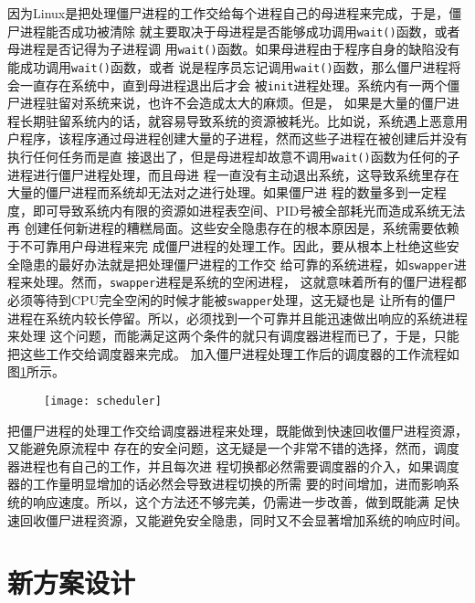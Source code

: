\documentclass{swfuthesism}
\begin{document}
因为Linux是把处理僵尸进程的工作交给每个进程自己的母进程来完成，于是，僵尸进程能否成功被清除
就主要取决于母进程是否能够成功调用\texttt{wait()}函数，或者母进程是否记得为子进程调
用\texttt{wait()}函数。如果母进程由于程序自身的缺陷没有能成功调用\texttt{wait()}函数，或者
说是程序员忘记调用\texttt{wait()}函数，那么僵尸进程将会一直存在系统中，直到母进程退出后才会
被\texttt{init}进程处理。系统内有一两个僵尸进程驻留对系统来说，也许不会造成太大的麻烦。但是，
如果是大量的僵尸进程长期驻留系统内的话，就容易导致系统的资源被耗光。比如说，系统遇上恶意用
户程序，该程序通过母进程创建大量的子进程，然而这些子进程在被创建后并没有执行任何任务而是直
接退出了，但是母进程却故意不调用\texttt{wait()}函数为任何的子进程进行僵尸进程处理，而且母进
程一直没有主动退出系统，这导致系统里存在大量的僵尸进程而系统却无法对之进行处理。如果僵尸进
程的数量多到一定程度，即可导致系统内有限的资源如进程表空间、PID号被全部耗光而造成系统无法再
创建任何新进程的糟糕局面。这些安全隐患存在的根本原因是，系统需要依赖于不可靠用户母进程来完
成僵尸进程的处理工作。因此，要从根本上杜绝这些安全隐患的最好办法就是把处理僵尸进程的工作交
给可靠的系统进程，如\texttt{swapper}进程来处理。然而，\texttt{swapper}进程是系统的空闲进程，
这就意味着所有的僵尸进程都必须等待到CPU完全空闲的时候才能被\texttt{swapper}处理，这无疑也是
让所有的僵尸进程在系统内较长停留。所以，必须找到一个可靠并且能迅速做出响应的系统进程来处理
这个问题，而能满足这两个条件的就只有调度器进程而已了，于是，只能把这些工作交给调度器来完成。
加入僵尸进程处理工作后的调度器的工作流程如图\ref{fig:scheduler-wait}所示。

\begin{figure}
  \centering
  \texttt{[image: scheduler]}
  \label{fig:scheduler-wait}
\end{figure}

把僵尸进程的处理工作交给调度器进程来处理，既能做到快速回收僵尸进程资源，又能避免原流程中
存在的安全问题，这无疑是一个非常不错的选择，然而，调度器进程也有自己的工作，并且每次进
程切换都必然需要调度器的介入，如果调度器的工作量明显增加的话必然会导致进程切换的所需
要的时间增加，进而影响系统的响应速度。所以，这个方法还不够完美，仍需进一步改善，做到既能满
足快速回收僵尸进程资源，又能避免安全隐患，同时又不会显著增加系统的响应时间。

\section{新方案设计}
\label{sec:design}
\end{document}
